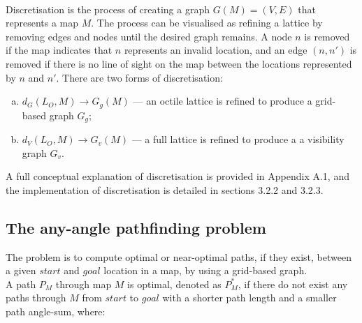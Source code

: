 \documentclass[12pt,notitlepage]{report}
\begin{document}
\\
\noindent
Discretisation is the process of creating a graph $G(M)=(V,E)$ that represents a map $M$. The process can be visualised as refining a lattice by removing edges and nodes until the desired graph remains. A node $n$ is removed if the map indicates that $n$ represents an invalid location, and an edge $(n,n')$ is removed if there is no line of sight on the map between the locations represented by $n$ and $n'$. There are two forms of discretisation:
\begin{enumerate}[(a)]
\item $d_{G}(L_{O},M) \rightarrow G_{g}(M)$ --- an octile lattice is refined to produce a grid-based graph $G_{g}$;
\item  $d_{V}(L_{O},M) \rightarrow G_{v}(M)$ --- a full lattice is refined to produce a a visibility graph $G_{v}$.
\end{enumerate}
 
\noindent
A full conceptual explanation of discretisation is provided in Appendix A.1, and the implementation of discretisation is detailed in sections 3.2.2 and 3.2.3.

\subsection{The any-angle pathfinding problem}

The problem is to compute optimal or near-optimal paths, if they exist, between a given $start$ and $goal$ location in a map, by using a grid-based graph.\\

\noindent
A path $P_{M}$ through map $M$ is optimal, denoted as $P^{*}_{M}$, if there do not exist any paths through $M$ from $start$ to $goal$ with a shorter path length and a smaller path angle-sum, where:
\end{document}
